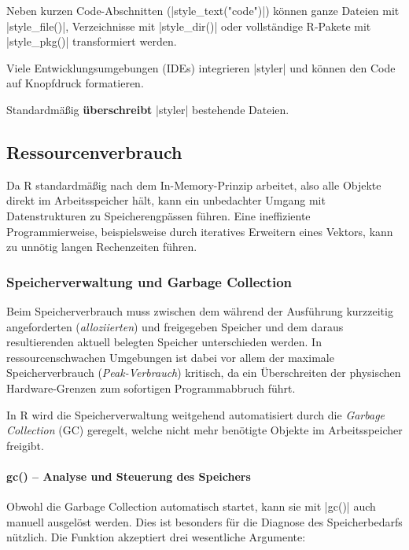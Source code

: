 \documentclass[10pt,twocolumn]{scrartcl}
\renewcommand{\lstinline}{\mycoloredinline}
\begin{document}
Neben kurzen Code-Abschnitten (\lstinline|style_text("code")|) können ganze Dateien mit \lstinline|style_file()|, Verzeichnisse mit \lstinline|style_dir()| oder vollständige R-Pakete mit \lstinline|style_pkg()| transformiert werden. 

Viele Entwicklungsumgebungen (IDEs) integrieren \lstinline|styler| und können den Code auf Knopfdruck formatieren.

Standardmäßig \textbf{überschreibt} \lstinline|styler| bestehende Dateien.


\subsection{Ressourcenverbrauch}

Da R standardmäßig nach dem In-Memory-Prinzip arbeitet, also alle Objekte direkt im Arbeitsspeicher hält, kann ein unbedachter Umgang mit Datenstrukturen zu Speicherengpässen führen. Eine ineffiziente Programmierweise, beispielsweise durch iteratives Erweitern eines Vektors, kann zu unnötig langen Rechenzeiten führen.


\subsubsection{Speicherverwaltung und Garbage Collection}

Beim Speicherverbrauch muss zwischen dem während der Ausführung kurzzeitig angeforderten (\emph{alloziierten})  und freigegeben Speicher und dem daraus resultierenden aktuell belegten Speicher unterschieden werden. In ressourcenschwachen Umgebungen ist dabei vor allem der maximale Speicherverbrauch (\emph{Peak-Verbrauch}) kritisch, da ein Überschreiten der physischen Hardware-Grenzen zum sofortigen Programmabbruch führt.

In R wird die Speicherverwaltung weitgehend automatisiert durch die \emph{Garbage Collection} (GC) geregelt, welche nicht mehr benötigte Objekte im Arbeitsspeicher freigibt.

\paragraph{gc() -- Analyse und Steuerung des Speichers}

Obwohl die Garbage Collection automatisch startet, kann sie mit \lstinline|gc()| auch manuell ausgelöst werden. Dies ist besonders für die Diagnose des Speicherbedarfs nützlich. Die Funktion akzeptiert drei wesentliche Argumente:
\end{document}
